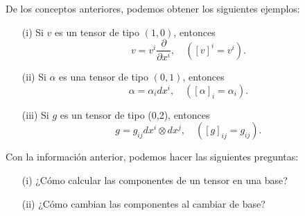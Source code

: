 \begin{example}
De los conceptos anteriores, podemos obtener los siguientes ejemplos:
\begin{enumerate}
    \item[(i)] Si $v$ es un tensor de tipo $(1,0)$, entonces
    \begin{equation*}
        v=v^i\frac{\partial}{\partial x^i},\quad([v]^i=v^i).
    \end{equation*}
    \item[(ii)] Si $\alpha$ es una tensor de tipo $(0,1)$, entonces
    \begin{equation*}
        \alpha=\alpha_idx^i,\quad([\alpha]_i=\alpha_i).
    \end{equation*}
    \item[(iii)] Si $g$ es un tensor de tipo (0,2), entonces
    \begin{equation*}
        g=g_{ij}dx^i\otimes dx^j,\quad([g]_{ij}=g_{ij}).
    \end{equation*}
\end{enumerate}
\end{example}

\begin{observation}
Con la informaci\'on anterior, podemos hacer las siguientes preguntas:
\begin{enumerate}
    \item[(i)] ¿C\'omo calcular las componentes de un tensor en una base?
    \item[(ii)] ¿C\'omo cambian las componentes al cambiar de base?
\end{enumerate}
\end{observation}

